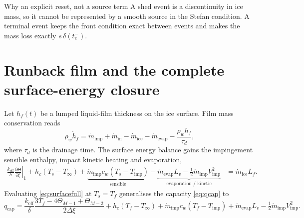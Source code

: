 \documentclass[11pt,a4paper]{article}
\newcommand{\pd}[2]{\frac{\partial #1}{\partial #2}}
\newcommand{\Ts}{T_s}
\newcommand{\Tinf}{T_\infty}
\newcommand{\Tf}{T_f}
\newcommand{\Timp}{T_{\mathrm{imp}}}
\newcommand{\Lf}{L_f}
\newcommand{\keff}{k_{\mathrm{eff}}}
\newcommand{\mdot}{\dot m}
\begin{document}
\begin{insightbox}{Why an explicit reset, not a source term}
A shed event is a discontinuity in ice mass, so it cannot be represented by a smooth
source in the Stefan condition. A terminal event keeps the front condition exact between
events and makes the mass loss exactly $s\,\delta(t_e^-)$.
\end{insightbox}

\section{Runback film and the complete surface-energy closure}\label{sec:film}

Let $h_f(t)$ be a lumped liquid-film thickness on the ice surface. Film mass conservation
reads
\begin{equation}\label{eq:filmmass}
  \rho_w\dot h_f=\mdot_{\mathrm{imp}}+\mdot_{\mathrm{in}}-\mdot_{\mathrm{ice}}
                 -\mdot_{\mathrm{evap}}-\frac{\rho_w h_f}{\tau_d},
\end{equation}
where $\tau_d$ is the drainage time. The surface energy balance gains the impingement
sensible enthalpy, impact kinetic heating and evaporation,
\begin{align}\label{eq:surfacefull}
  \frac{\keff}{\delta}\left.\pd{\Theta}{\xi}\right|_1
   +h_c(\Ts-\Tinf)
   +\underbrace{\mdot_{\mathrm{imp}}c_w(\Ts-\Timp)}_{\text{sensible}}
   +\underbrace{\mdot_{\mathrm{evap}}L_v-\tfrac12\mdot_{\mathrm{imp}}V_{\mathrm{imp}}^2}_{\text{evaporation / kinetic}}
   &=\mdot_{\mathrm{ice}}\Lf .
\end{align}
Evaluating \eqref{eq:surfacefull} at $\Ts=\Tf$ generalises the capacity \eqref{eq:qcap} to
\begin{equation}\label{eq:qcapfull}
  q_{\mathrm{cap}}=\frac{\keff}{\delta}
   \frac{3\Tf-4\Theta_{M-1}+\Theta_{M-2}}{2\Delta\xi}
   +h_c(\Tf-\Tinf)+\mdot_{\mathrm{imp}}c_w(\Tf-\Timp)
   +\mdot_{\mathrm{evap}}L_v-\tfrac12\mdot_{\mathrm{imp}}V_{\mathrm{imp}}^2 .
\end{equation}
\end{document}
